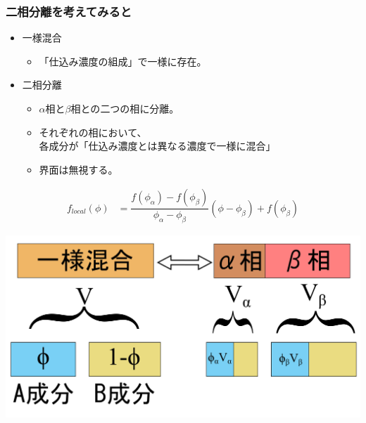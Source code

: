 \documentclass[unicode,12pt]{beamer}%
\begin{document}
\begin{frame}
	\frametitle{二相分離を考えてみると}
		\begin{itemize}
		\item 一様混合
		\begin{itemize}
			\item \alert{「仕込み濃度の組成」で一様}に存在。
			\end{itemize}
		\item 二相分離
		\begin{itemize}
			 \item $\alpha$相と$\beta$相との\alert{二つの相}に分離。
			 \item それぞれの相において、\\各成分が\alert{「仕込み濃度とは異なる濃度で一様に混合」}
			 \item 界面は無視する。
		\end{itemize}
	\end{itemize}
	\begin{align*}
		f_{local}(\phi)
		&= \dfrac{f (\phi_\alpha) -f (\phi_\beta)}{\phi _\alpha -\phi _\beta} (\phi - \phi _\beta) + f (\phi_\beta)
	\end{align*}

		\centering
			\includegraphics[width=.45\textwidth]{freeEform_1.png}
\end{frame}
\end{document}
